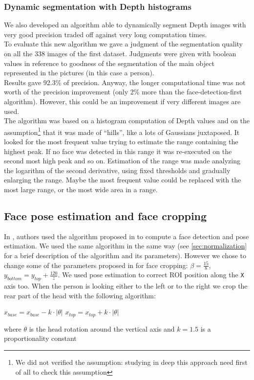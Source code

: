 \documentclass{article}
\begin{document}
\subsubsection{Dynamic segmentation with Depth histograms}
We also developed an algorithm able to dynamically segment Depth images with very good precision traded off against very long computation times. \\
To evaluate this new algorithm we gave a judgment of the segmentation quality on all the 338 images of the first dataset. Judgments were given with boolean values in reference to goodness of the segmentation of the main object represented in the pictures (in this case a person).	\\
Results gave 92.3\% of precision. Anyway, the longer computational time was not worth of the precision improvement (only 2\% more than the face-detection-first algorithm). However, this could be an improvement if very different images are used. \\
The algorithm was based on a histogram computation of Depth values and on the
assumption\footnote{We did not verified the assumption: studying in deep
this approach need first of all to check this assumption} that it was made of
``hills'', like a lots of Gaussians juxtaposed.
It looked for the most frequent value trying to estimate the range containing
the highest peak. If no face was detected in this range it was re-executed on
the second most high peak and so on. Estimation of the range was made
analyzing the logarithm of the second derivative, using fixed thresholds and
gradually enlarging the range. Maybe the most frequent value could be replaced
with the most large range, or the most wide area in a range.

\subsection{Face pose estimation and face cropping}	\label{sec:cropping}
In \citet{Hayat2016}, authors used the algorithm proposed in
\citet{Fanelli2011} to compute a face detection and pose estimation. We used
the same algorithm in the same way (see \ref{sec:normalization} for a brief
description of the algorithm and its parameters). However we chose to change
some of the parameters proposed in \citet{Hayat2016} for face cropping: $\beta
= \frac{15}{8}$, $y_{bottom} = y_{top} + \frac{120}{z}$. We used pose
estimation to correct ROI position along the \verb|X| axis too. When the person
is looking either to the left or to the right we crop the rear part of the head
with the following algorithm:
\begin{algorithm}
	\begin{algorithmic}[1]
		\State $x_{base} = x_{base} - k \cdot |\theta|$
		\Else
		\State $x_{top} = x_{top} + k \cdot |\theta|$
		\EndIf
	\end{algorithmic}
\end{algorithm}
where $\theta$ is the head rotation around the vertical axis and $k = 1.5$ is a proportionality constant
\end{document}

